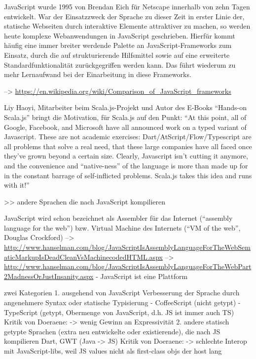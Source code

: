 \documentclass[a4paper, 12pt, hidelinks, listof=totoc, listoftables=totoc, bibliography=totoc]{scrreprt}
\begin{document}
JavaScript wurde 1995 von Brendan Eich für Netscape innerhalb von zehn Tagen entwickelt\cite{wikipedia.JS}. 
War der Einsatzzweck der Sprache zu dieser Zeit in erster Linie der, statische Webseiten durch interaktive Elemente attraktiver zu machen, so werden heute komplexe Webanwendungen in JavaScript geschrieben. Hierfür kommt häufig eine immer breiter werdende Palette an JavaScript-Frameworks zum Einsatz, durch die auf strukturierende Hilfsmittel sowie auf eine erweiterte Standardfunktionalität zurückgegriffen werden kann. Das führt wiederum zu mehr Lernaufwand bei der Einarbeitung in diese Frameworks.

-->  \url{https://en.wikipedia.org/wiki/Comparison_of_JavaScript_frameworks}


Liy Haoyi, Mitarbeiter beim Scala.js-Projekt und Autor des E-Books "`Hands-on Scala.js"' bringt die Motivation, für Scala.js auf den Punkt: "`At this point, all of Google, Facebook, and Microsoft have all announced work on a typed variant of Javascript. These are not academic exercises: Dart/AtScript/Flow/Typescript are all problems that solve a real need, that these large companies have all faced once they've grown beyond a certain size. Clearly, Javascript isn't cutting it anymore, and the convenience and "`native-ness"' of the language is more than made up for in the constant barrage of self-inflicted problems. Scala.js takes this idea and runs with it!"'\cite[\#TheLanguage]{haoyi.HOS}




>> andere Sprachen die nach JavaScript kompilieren

JavaScript wird schon bezeichnet als Assembler für das Internet ("`assembly language for the web"') bzw. Virtual Machine des Internets ("`VM of the web"', Douglas Crockford)
  -->  \url{http://www.hanselman.com/blog/JavaScriptIsAssemblyLanguageForTheWebSematicMarkupIsDeadCleanVsMachinecodedHTML.aspx}
  --> \url{http://www.hanselman.com/blog/JavaScriptIsAssemblyLanguageForTheWebPart2MadnessOrJustInsanity.aspx}
  - JavaScript ist eine Plattform\cite{doeraene2015.SSP}

zwei Kategorien
1. ausgehend von JavaScript Verbesserung der Sprache durch angenehmere Syntax oder statische Typisierung
	- CoffeeScript (nicht getypt)
	- TypeScript (getypt, Obermenge von JavaScript, d.h. JS ist immer auch TS)
	Kritik von Doeraene: -> wenig Gewinn an Expressivität
2. andere statisch getypte Sprachen (extra neu entwickelte oder existierende), die nach JS kompilieren
	Dart, GWT (Java -> JS)
	Kritik von Doeraene: -> schlechte Interop mit JavaScript-libs, weil JS values nicht als first-class objs der host lang
\cite[S. 1]{doeraene2013.TDI}
\end{document}

